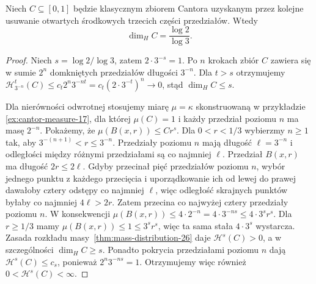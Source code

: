 \begin{twierdzenie}
\label{thm:cantor-dimension-26}
Niech $C\subseteq[0,1]$ będzie klasycznym zbiorem
Cantora uzyskanym przez kolejne usuwanie otwartych
środkowych trzecich części przedziałów. Wtedy
\[
 \dim_HC=\frac{\log2}{\log3}.
\]
\end{twierdzenie}
\begin{proof}
Niech $s=\log2/\log3$, zatem $2\cdot3^{-s}=1$.
Po $n$ krokach zbiór $C$ zawiera się w sumie
$2^n$ domkniętych przedziałów długości $3^{-n}$.
Dla $t>s$ otrzymujemy
$\mathcal H^t_{3^{-n}}(C)\le
c_t2^n3^{-nt}=c_t(2\cdot3^{-t})^n\to0$,
stąd $\dim_HC\le s$.

Dla nierówności odwrotnej stosujemy miarę $\mu=\kappa$ skonstruowaną w przykładzie \ref{ex:cantor-measure-17}, dla której $\mu(C)=1$ i każdy przedział poziomu $n$ ma masę $2^{-n}$.
Pokażemy, że $\mu(B(x,r))\le Cr^s$.
Dla $0<r<1/3$ wybierzmy $n\ge1$ tak, aby
$3^{-(n+1)}<r\le3^{-n}$. Przedziały poziomu $n$
mają długość $\ell=3^{-n}$ i odległości między
różnymi przedziałami są co najmniej $\ell$.
Przedział $B(x,r)$ ma długość $2r\le2\ell$.
Gdyby przecinał pięć przedziałów poziomu $n$, wybór jednego punktu z każdego przecięcia i uporządkowanie ich od lewej do prawej dawałoby cztery odstępy co najmniej $\ell$, więc odległość skrajnych punktów byłaby co najmniej $4\ell>2r$. Zatem przecina co najwyżej cztery przedziały poziomu $n$. W konsekwencji
$\mu(B(x,r))\le4\cdot2^{-n}
=4\cdot3^{-ns}\le4\cdot3^sr^s$.
Dla $r\ge1/3$ mamy $\mu(B(x,r))\le1\le3^sr^s$, więc ta sama stała $4\cdot3^s$ wystarcza.
Zasada rozkładu masy~\ref{thm:mass-distribution-26}
daje $\mathcal H^s(C)>0$, a w szczególności
$\dim_HC\ge s$. Ponadto pokrycia przedziałami
poziomu $n$ dają $\mathcal H^s(C)\le c_s$, ponieważ
$2^n3^{-ns}=1$. Otrzymujemy więc również
$0<\mathcal H^s(C)<\infty$.
\end{proof}

